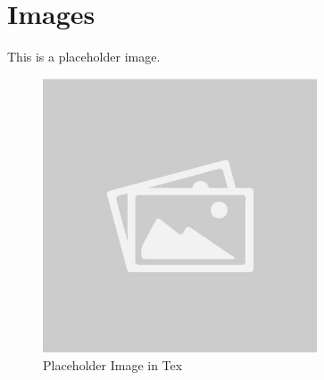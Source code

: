 \section{Images}
\lipsum[50]
This is a placeholder image.
\begin{figure}[!t]
	\includegraphics[width=3.2in]{./images/placeholder_image}
	\caption{Placeholder Image in Tex}
\end{figure}